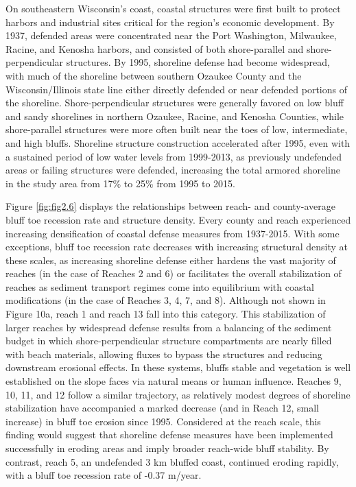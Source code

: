 On southeastern Wisconsin’s coast, coastal structures were first built to
protect harbors and industrial sites critical for the region’s economic
development. By 1937, defended areas were concentrated near the Port Washington,
Milwaukee, Racine, and Kenosha harbors, and consisted of both shore-parallel and
shore-perpendicular structures. By 1995, shoreline defense had become
widespread, with much of the shoreline between southern Ozaukee County and the
Wisconsin/Illinois state line either directly defended or near defended portions
of the shoreline. Shore-perpendicular structures were generally favored on low
bluff and sandy shorelines in northern Ozaukee, Racine, and Kenosha Counties,
while shore-parallel structures were more often built near the toes of low,
intermediate, and high bluffs. Shoreline structure construction accelerated
after 1995, even with a sustained period of low water levels from 1999-2013, as
previously undefended areas or failing structures were defended, increasing the
total armored shoreline in the study area from 17\% to 25\% from 1995 to 2015.

Figure \ref{fig:fig2.6} displays the relationships between reach- and
county-average bluff toe recession rate and structure density. Every county and
reach experienced increasing densification of coastal defense measures from
1937-2015. With some exceptions, bluff toe recession rate decreases with
increasing structural density at these scales, as increasing shoreline defense
either hardens the vast majority of reaches (in the case of Reaches 2 and 6) or
facilitates the overall stabilization of reaches as sediment transport regimes
come into equilibrium with coastal modifications (in the case of Reaches 3, 4,
7, and 8). Although not shown in Figure 10a, reach 1 and reach 13 fall into this
category. This stabilization of larger reaches by widespread defense results
from a balancing of the sediment budget in which shore-perpendicular structure
compartments are nearly filled with beach materials, allowing fluxes to bypass
the structures and reducing downstream erosional effects. In these systems,
bluffs stable and vegetation is well established on the slope faces via natural
means or human influence. Reaches 9, 10, 11, and 12 follow a similar trajectory,
as relatively modest degrees of shoreline stabilization have accompanied a
marked decrease (and in Reach 12, small increase) in bluff toe erosion since
1995. Considered at the reach scale, this finding would suggest that shoreline
defense measures have been implemented successfully in eroding areas and imply
broader reach-wide bluff stability. By contrast, reach 5, an undefended 3 km
bluffed coast, continued eroding rapidly, with a bluff toe recession rate of
-0.37 m/year. 

